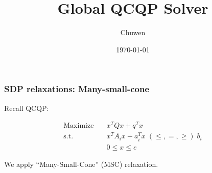 
\usepackage{subfig}
\usepackage[style=verbose]{biblatex}
\usepackage{bm}
\title{Global QCQP Solver}
\author{Chuwen}
\date{\today}




\fontsize{8pt}{11.2}\selectfont
\frame{\titlepage}



\begin{frame}
  \frametitle{SDP relaxations: Many-small-cone}
  Recall QCQP:

  \begin{equation}
    \begin{aligned}
      \mathrm{Maximize}\quad & x^TQx + q^T x                                   \\
      \mathrm{s.t.}  \quad   & x^{T} A_i x  + a_i^Tx   \; (\le, =, \ge) \; b_i \\
                             & 0\le x\le e
    \end{aligned}
  \end{equation}

  We apply ``Many-Small-Cone'' (MSC) relaxation.
\end{frame}

